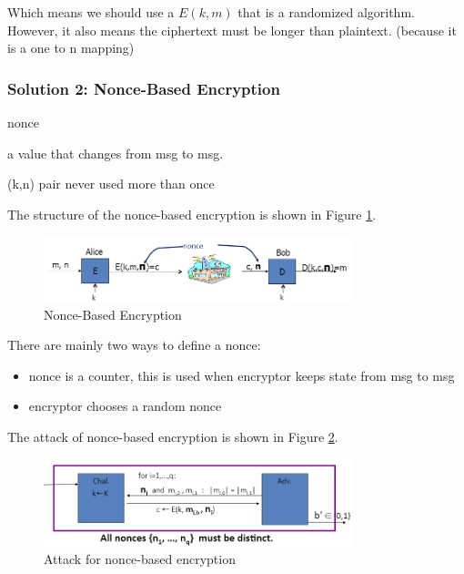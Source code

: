 Which means we should use a $E(k,m)$ that is a randomized algorithm. However, it also means the ciphertext must be longer than plaintext. (because it is a one to n mapping)

\subsubsection{Solution 2: Nonce-Based Encryption}

\begin{definition} [nonce] nonce

    a value that changes from msg to msg.

    (k,n) pair never used more than once
    
\end{definition}

The structure of the nonce-based encryption is shown in Figure \ref{fig: 03 Nonce-Based Encryption}.


\begin{figure}[h]
    \centering
    \includegraphics[width=0.8\textwidth]{Stanford_Crypto_1/fig/03_block_cipher/nonce-based encrpytion.png}
    \caption{Nonce-Based Encryption}
    \label{fig: 03 Nonce-Based Encryption}
\end{figure}

There are mainly two ways to define a nonce:
\begin{itemize} [itemsep=2pt,topsep=0pt,parsep=0pt]
    \item nonce is a counter, this is used when encryptor keeps state from msg to msg
    \item encryptor chooses a random nonce
\end{itemize}

The attack of nonce-based encryption is shown in Figure \ref{fig: 03 Attack for nonce-based encryption}.

\begin{figure}[h]
    \centering
    \includegraphics[width=0.8\textwidth]{Stanford_Crypto_1/fig/03_block_cipher/Attack for nonce-based encryption.png}
    \caption{Attack for nonce-based encryption}
    \label{fig: 03 Attack for nonce-based encryption}
\end{figure}

